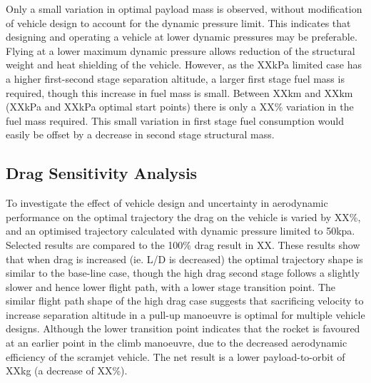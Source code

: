 Only a small variation in optimal payload mass is observed, without modification of vehicle design to account for the dynamic pressure limit. This indicates that designing and operating a vehicle at lower dynamic pressures may be preferable. Flying at a lower maximum dynamic pressure allows reduction of the structural weight and heat shielding of the vehicle. However, as the XXkPa limited case has a higher first-second stage separation altitude, a larger first stage fuel mass is required, though this increase in fuel mass is small. Between XXkm  and XXkm (XXkPa and XXkPa optimal start points) there is only a XX\% variation in the fuel mass required. This small variation in first stage fuel consumption would easily be offset by a decrease in second stage structural mass. 


\subsection{Drag Sensitivity Analysis}\label{sec:dragvariation}


To investigate the effect of vehicle design and uncertainty in aerodynamic performance on the optimal trajectory the drag on the vehicle is varied by XX\%, and an optimised trajectory calculated with dynamic pressure limited to 50kpa. Selected results are compared to the 100\% drag result in XX. 
These results show that when drag is increased (ie. L/D is decreased) the optimal trajectory shape is similar to the base-line case, though the high drag second stage follows a slightly slower and hence lower flight path, with a lower stage transition point. The similar flight path shape of the high drag case suggests that sacrificing velocity to increase separation altitude in a pull-up manoeuvre is optimal for multiple vehicle designs. Although the lower transition point indicates that the rocket is favoured at an earlier point in the climb manoeuvre, due to the decreased aerodynamic efficiency of the scramjet vehicle. 
The net result is  a lower payload-to-orbit of XXkg (a decrease of XX\%). 

